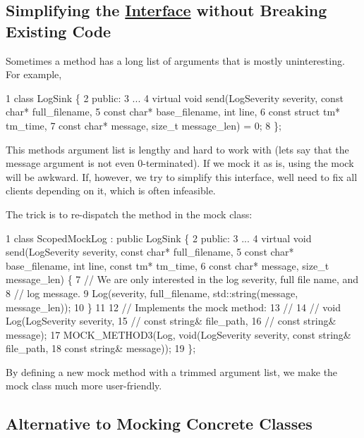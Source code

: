 \subsection*{Simplifying the \hyperlink{classInterface}{Interface} without Breaking Existing Code}

Sometimes a method has a long list of arguments that is mostly uninteresting. For example,


\begin{DoxyCode}
1 class LogSink \{
2  public:
3   ...
4   virtual void send(LogSeverity severity, const char* full\_filename,
5                     const char* base\_filename, int line,
6                     const struct tm* tm\_time,
7                     const char* message, size\_t message\_len) = 0;
8 \};
\end{DoxyCode}


This method\textquotesingle{}s argument list is lengthy and hard to work with (let\textquotesingle{}s say that the {\ttfamily message} argument is not even 0-\/terminated). If we mock it as is, using the mock will be awkward. If, however, we try to simplify this interface, we\textquotesingle{}ll need to fix all clients depending on it, which is often infeasible.

The trick is to re-\/dispatch the method in the mock class\+:


\begin{DoxyCode}
1 class ScopedMockLog : public LogSink \{
2  public:
3   ...
4   virtual void send(LogSeverity severity, const char* full\_filename,
5                     const char* base\_filename, int line, const tm* tm\_time,
6                     const char* message, size\_t message\_len) \{
7     // We are only interested in the log severity, full file name, and
8     // log message.
9     Log(severity, full\_filename, std::string(message, message\_len));
10   \}
11 
12   // Implements the mock method:
13   //
14   //   void Log(LogSeverity severity,
15   //            const string& file\_path,
16   //            const string& message);
17   MOCK\_METHOD3(Log, void(LogSeverity severity, const string& file\_path,
18                          const string& message));
19 \};
\end{DoxyCode}


By defining a new mock method with a trimmed argument list, we make the mock class much more user-\/friendly.

\subsection*{Alternative to Mocking Concrete Classes}

